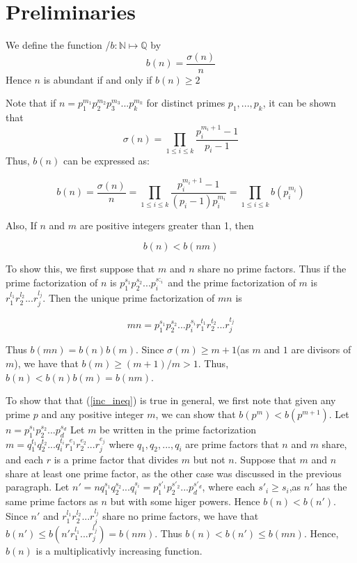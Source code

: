 \documentclass[../paper.tex]{article}
\begin{document}
\section{Preliminaries}

We define the function /$b: \mathbb{N} \mapsto \mathbb{Q}$ by
%
$$b(n) = \frac{\sigma(n)}{n} $$
%
Hence $n$ is abundant if and only if $b(n) \geq 2$

Note that if $n=p_1^{m_1}p_2^{m_2}p_3^{m_3}...p_{k}^{m_k}$ 
for distinct primes $p_1, ..., p_k$, it can be shown that 
%
$$\sigma(n) = \prod_{1 \leq i \leq k} \frac{p_i^{m_i + 1} -1}{p_i -1}$$
%
Thus, $b(n)$ can be expressed as:


\begin{equation}\label{b_stuff}
  b(n) = \frac{\sigma(n)}{n} = \prod_{1 \leq i \leq k} 
  \frac{p_i^{m_i + 1} -1}{(p_i -1)p_{i}^{m_{i}}}
  =\prod_{1 \leq i \leq k} b(p_i^{m_i})
\end{equation}

Also, If $n$ and $m$ are positive integers greater than 1, then

\begin{equation}\label{inc_ineq}
  b(n) < b(nm) %
\end{equation}

To show this, we first suppose that $m$ and $n$ share no prime factors.
Thus if the prime factorization of $n$ is $p_1^{s_1} p_2^{s_2} ... p_i^{s:_i}$ 
and the prime factorization of $m$ is $r_1^{l_1} r_2^{l_2} ... r_j^{l_j}$.
Then the unique prime factorization of $mn$ is 

$$mn = p_1^{s_1} p_2^{s_2} ... p_i^{s_i} r_1^{t_1} r_2^{t_2} ... r_j^{t_j}$$

Thus $b(mn) = b(n)b(m)$. Since $\sigma(m) \geq m + 1$(as $m$ and 
$1$ are divisors of $m$), we have that $b(m) \geq (m + 1) / m > 1$.
Thus,
$b(n) < b(n)b(m) = b(nm)$. 


To show that that (\ref{inc_ineq}) is true in general,
we first note that given any prime $p$ and
any positive integer $m$, we can show that $b(p^m) < b(p^{m + 1})$.
Let $n = p_1^{s_1} p_2^{s_2}... p_d^{s_d}$ 
Let $m$ be written in the prime factorization 
$m = q_1^{t_1} q_2^{t_2} ... q_i^{t_i} 
r_1^{e_1} r_2^{e_2} ... r_j^{e_j}$ where 
$q_1, q_2, ..., q_i$ are prime factors that $n$ and $m$ share,
and each $r$ is a prime factor that divides $m$ but not $n$.
Suppose that $m$ and $n$ share at least one prime factor, as the 
other case was discussed in the previous paragraph.
%
Let $n' = n q_1^{s_1} q_2^{s_2} ... q_i^{s_i} =
p_1^{s'_1} p_2^{s'_2} ... p_d^{s'_d}$, where each $s'_i \geq s_i$,as
$n'$ has the same prime factors as $n$ but with some higer powers.
Hence $b(n) < b(n')$. Since $n'$ and $r_1^{l_1} r_2^{l_2} ... r_j^{l_j}$
share no prime factors, we have that 
$b(n') \leq b(n' r_1^{l_1} ... r_j^{l_j}) = b(nm)$.
Thus $b(n) < b(n') \leq b(mn)$. Hence, $b(n)$ is a 
multiplicativly increasing function.
\\
\end{document}
